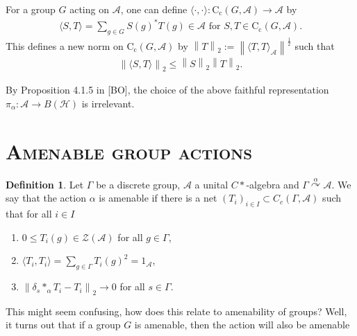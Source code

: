 \documentclass[10pt,oneside,openany,final]{memoir}
\newcommand{\ssection}[1]{%
\newpage%
\section[#1]{\centering\normalfont\scshape \textbf{#1}}}
\theoremstyle{definition}
\newtheorem{definition}[theorem]{Definition}
\theoremstyle{Break}
\newcommand{\lv}{\left\lVert}
\newcommand{\rv}{\right\rVert}
\newcommand{\A}{\mathcal{A}}
\newcommand{\cc}{\text{C}_{\text{c}}}
\renewcommand{\H}{\mathcal{H}}
\def\acts{\curvearrowright}
\begin{document}
For a group $G$ acting on $\A$, one can define $\langle \cdot, \cdot \rangle \colon \cc(G,\A) \to \A$ by 
\begin{align*}
	\langle S,T \rangle = \sum_{g \in G}S(g)^*T(g) \in \A \text{ for } S,T \in \cc(G,\A).
\end{align*}
This defines a new norm on $\cc(G,\A)$ by $\lv T \rv_{2}:= \lv \langle T,T \rangle_{\A}\rv^{\frac{1}{2}}$ such that 
\begin{align*}
\lv \langle S,T \rangle \rv_{2} \leq \lv S \rv_{2} \lv T \rv_{2}.
\end{align*}

By Proposition 4.1.5 in [BO], the choice of the above faithful representation $\pi_\alpha \colon \A \to B(\H)$ is irrelevant.

\ssection{Amenable group actions}
\begin{definition}
Let $\Gamma$ be a discrete group, $\mathcal{A}$ a unital $C*$-algebra and $\Gamma \stackrel{\alpha}{\acts} \mathcal{A}$. We say that the action $\alpha$ is amenable if there is a net $(T_{i})_{i \in I} \subset C_{c}(\Gamma,\mathcal{A})$ such that for all $i \in I$
\begin{enumerate}
\item $0 \leq T_{i}(g) \in \mathcal{Z}(\mathcal{A})$ for all $g \in \Gamma$,\\
\item $\langle T_{i}, T_{i} \rangle = \sum_{g \in \Gamma} T_{i}(g)^2=1_{\mathcal{A}}$,\\
\item $\lv \delta_{s} \ast_{\alpha} T_{i}-T_{i}\rv_{2} \to 0$ for all $s \in \Gamma$.
\end{enumerate}
\end{definition}
This might seem confusing, how does this relate to amenability of groups? Well, it turns out that if a group $G$ is amenable, then the action will also be amenable
\end{document}
